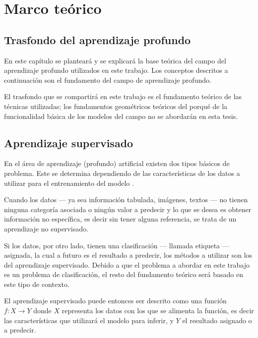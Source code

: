 \chapter{Marco teórico} %

\label{Chapter2} %

\section{Trasfondo del aprendizaje profundo} %

En este capítulo se planteará y se explicará la base teórica del campo del aprendizaje profundo utilizados en este trabajo. Los conceptos descritos a continuación son el fundamento del campo de aprendizaje profundo.

El trasfondo que se compartirá en este trabajo es el fundamento teórico de las técnicas utilizadas; los fundamentos geométricos teóricos \parencite{2018leigeometric} del porqué de la funcionalidad básica de los modelos del campo no se abordarán en esta tesis.

\section{Aprendizaje supervisado}

En el área de aprendizaje (profundo) artificial existen dos tipos básicos de problema. Este se determina dependiendo de las características de los datos a utilizar para el entrenamiento del modelo \parencite{schmidhuber2015deep}.

Cuando los datos --- ya sea información tabulada, imágenes, textos --- no tienen ninguna categoría asociada o ningún valor a predecir y lo que se desea es obtener información no específica, es decir sin tener alguna referencia, se trata de un aprendizaje no supervisado.

Si los datos, por otro lado, tienen una clasificación  --- llamada etiqueta --- asignada, la cual a futuro es el resultado a predecir, los métodos a utilizar son los del aprendizaje supervisado. Debido a que el problema a abordar en este trabajo es un problema de clasificación, el resto del fundamento teórico será basado en este tipo de contexto.

El aprendizaje supervisado puede entonces ser descrito como una función $f : X \to Y$ donde $X$ representa los datos con los que se alimenta la función, es decir las características que utilizará el modelo para inferir, y $Y$ el resultado asignado o a predecir.

